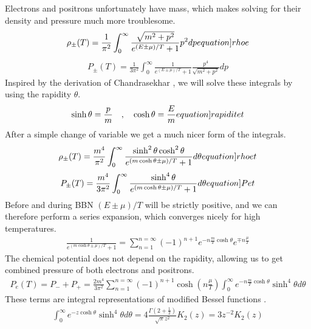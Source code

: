 Electrons and positrons unfortunately have mass, which makes solving for their density and pressure much more troublesome.
\begin{align}
    \rho_\pm(T)=\frac{1}{\pi^2}\int_{0}^{\infty}\frac{\sqrt{m^2+p^2}}{e^{(E\pm\mu)/T}+1}p^2 dp
    \label[equation]{rhoe}
\end{align}
\begin{align}
    P_\pm(T)=\frac{1}{3\pi^2}\int_{0}^{\infty}\frac{1}{e^{(E\pm\mu)/T}+1}\frac{p^4}{\sqrt{m^2+p^2}} dp
\end{align}
Inspired by the derivation of Chandrasekhar \cite{Chandrasekhar}, we will solve these integrals by using the rapidity $\theta$.
\begin{align}
    \sinh \theta = \frac{p}{m}\eqsep \cosh \theta = \frac{E}{m}
    \label[equation]{rapiditet}
\end{align}
After a simple change of variable we get a much nicer form of the integrals.
\begin{align}
    \rho_\pm(T)=\frac{m^4}{\pi^2}\int_{0}^{\infty}\frac{\sinh^2 \theta \cosh^2\theta}{e^{(m \cosh\theta\pm\mu)/T}+1} d\theta
    \label[equation]{rhoet}
\end{align}
\begin{align}
    P_\pm(T)=\frac{m^4}{3\pi^2}\int_{0}^{\infty}\frac{\sinh^4 \theta}{e^{(m \cosh\theta\pm\mu)/T}+1} d\theta
    \label[equation]{Pet}
\end{align}
Before and during BBN $(E\pm\mu)/T $ will be strictly positive, and we can therefore perform a series expansion, which converges nicely for high temperatures.
\begin{align}
    \frac{1}{e^{(m \cosh\theta\pm\mu)/T}+1}=\sum_{n=1}^{n=\infty} (-1)^{n+1} e^{-n\frac{m }{T}\cosh\theta}e^{\mp n\frac{\mu}{T}}
\end{align}
The chemical potential does not depend on the rapidity, allowing us to get combined pressure of both electrons and positrons.
\begin{align}
    P_e(T)=P_-+P_+=\frac{2m^4}{3\pi^2}\sum_{n=1}^{n=\infty} (-1)^{n+1} \cosh{\left(n\frac{\mu}{T}\right)}  \int_{0}^{\infty}e^{-n\frac{m }{T}\cosh\theta}\sinh^4 \theta d\theta
\end{align}
These terms are integral representations of modified Bessel functions \cite[\href{https://dlmf.nist.gov/10.32.E8}{(10.32.8)}]{NIST:DLMF}.
\begin{align}
    \int_{0}^{\infty}e^{-z\cosh\theta}\sinh^4 \theta d\theta=4\frac{\Gamma(2+\frac{1}{2})}{\sqrt{\pi}z^2}K_2\left(z\right)=3z^{-2}K_2\left(z\right)
\end{align}
